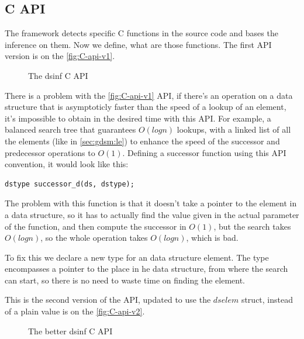 \documentclass[a4paper,11pt]{article}
\begin{document}
	\subsection{C API}
        The framework detects specific C functions in the source code and bases the inference on them. Now we define,
        what are those functions. The first API version is on the \autoref{fig:C-api-v1}.

        \begin{figure}[h!]
            

            \caption{The dsinf C API}

            \label{fig:C-api-v1}
        \end{figure}

        There is a problem with the \autoref{fig:C-api-v1} API, if there's an
        operation on a data structure that is asymptoticly faster than the
        speed of a lookup of an element, it's impossible to obtain in the
        desired time with this API. For example, a balanced search tree
        that guarantees $O(log n)$ lookups, with a linked list of all the
        elements (like in \autoref{sec:gdsm:le}) to enhance the speed of the
        successor and predecessor operations to $O(1)$. Defining a successor
        function using this API convention, it would look like this:

        \begin{lstlisting}
dstype successor_d(ds, dstype);
        \end{lstlisting}

        The problem with this function is that it doesn't take a pointer to the element in a data structure, so it has
        to actually find the value given in the actual parameter of the function, and then compute the successor in
        $O(1)$, but the search takes $O(log n)$, so the whole operation takes $O(log n)$, which is bad.

        To fix this we declare a new type for an data structure element. The type encompasses a pointer to the place in
        he data structure, from where the search can start, so there is no need to waste time on finding the element.

        This is the second version of the API, updated to use the $dselem$ struct, instead of a plain value is on the
        \autoref{fig:C-api-v2}.

        \begin{figure}[h!]
            
            \caption{The better dsinf C API}

            \label{fig:C-api-v2}
        \end{figure}
\end{document}
